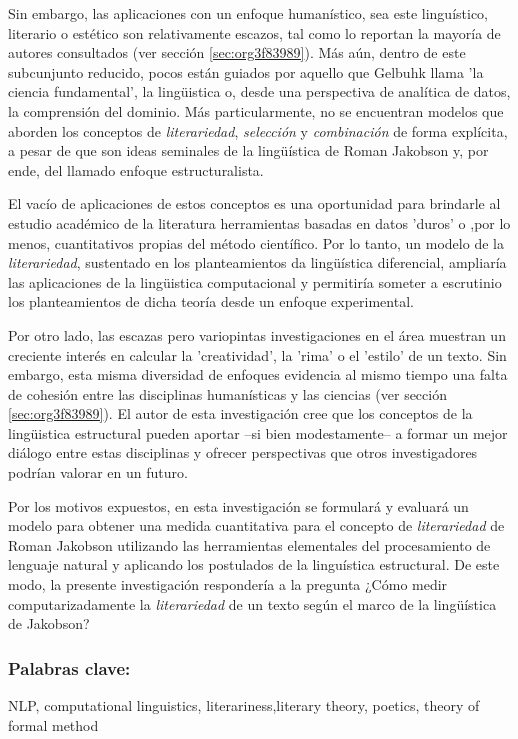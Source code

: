 \documentclass[12pt,letterpaper,twoside]{article}
\begin{document}
Sin embargo, las aplicaciones con un enfoque humanístico, sea este
linguístico, literario o estético son relativamente escazos, tal como
lo reportan la mayoría de autores consultados (ver sección \ref{sec:org3f83989}).  Más aún, dentro de este subcunjunto reducido, pocos
están guiados por aquello que Gelbuhk llama 'la ciencia fundamental',
la lingüistica o, desde una perspectiva de analítica de datos, la
comprensión del dominio. Más particularmente, no se encuentran modelos
que aborden los conceptos de \emph{literariedad}, \emph{selección} y \emph{combinación}
de forma explícita, a pesar de que son ideas seminales de la lingüística
de Roman Jakobson y, por ende, del llamado enfoque estructuralista.

El vacío de aplicaciones de estos conceptos es una oportunidad para
brindarle al estudio académico de la literatura herramientas basadas
en datos 'duros' o ,por lo menos, cuantitativos propias del método
científico. Por lo tanto, un modelo de la \emph{literariedad}, sustentado
en los planteamientos da lingüística diferencial, ampliaría las
aplicaciones de la lingüistica computacional y permitiría someter a
escrutinio los planteamientos de dicha teoría desde un enfoque
experimental.

Por otro lado, las escazas pero variopintas investigaciones en el área
muestran un creciente interés en calcular la 'creatividad', la 'rima'
o el 'estilo' de un texto. Sin embargo, esta misma diversidad de
enfoques evidencia al mismo tiempo una falta de cohesión entre las
disciplinas humanísticas y las ciencias (ver sección \ref{sec:org3f83989}). El autor de esta investigación cree que los conceptos de
la lingüistica estructural pueden aportar --si bien modestamente-- a
formar un mejor diálogo entre estas disciplinas y ofrecer perspectivas
que otros investigadores podrían valorar en un futuro.

Por los motivos expuestos, en esta investigación se formulará y
evaluará un modelo para obtener una medida cuantitativa para el
concepto de \emph{literariedad} de Roman Jakobson utilizando las
herramientas elementales del procesamiento de lenguaje natural y
aplicando los postulados de la linguística estructural. De este modo,
la presente investigación respondería a la pregunta ¿Cómo medir
computarizadamente la \emph{literariedad} de un texto según el marco de la
lingüística de Jakobson?

\subsubsection{\textbf{Palabras clave:}}
\label{sec:org37f819b}
NLP, computational linguistics, literariness,literary theory, poetics, theory of formal method
\end{document}
